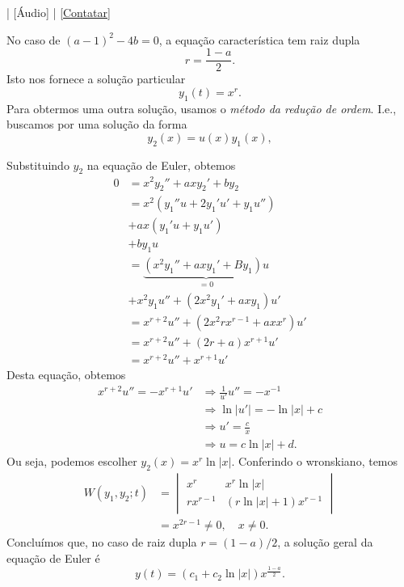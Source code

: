 \begin{flushright}
  [Vídeo] | [Áudio] | \href{https://phkonzen.github.io/notas/contato.html}{[Contatar]}
\end{flushright}

No caso de $(a-1)^2-4b = 0$, a equação característica tem raiz dupla
\begin{equation}
  r = \frac{1-a}{2}.
\end{equation}
Isto nos fornece a solução particular
\begin{equation}
  y_1(t) = x^r.
\end{equation}
Para obtermos uma outra solução, usamos o \emph{método da redução de ordem}. I.e., buscamos por uma solução da forma
\begin{equation}
  y_2(x) = u(x)y_1(x),
\end{equation}

Substituindo $y_2$ na equação de Euler, obtemos
\begin{align}
  0 &= x^2y_2'' + axy_2' + by_2 \\
  &= x^2\left(y_1''u + 2y_1'u' + y_1u''\right) \\
  &+ ax\left(y_1'u + y_1u'\right) \\
  &+ by_1u \\
  &= \underbrace{\left(x^2y_1'' + axy_1' + By_1\right)u}_{=0} \\
  &+ x^2y_1u'' + (2x^2y_1' + axy_1)u' \\
  &= x^{r+2}u'' + (2x^2rx^{r-1} + axx^r)u' \\
  &= x^{r+2}u'' + (2r+a)x^{r+1}u' \\
  &= x^{r+2}u'' + x^{r+1}u' 
\end{align}
Desta equação, obtemos
\begin{align}
  x^{r+2}u'' = -x^{r+1}u' &\Rightarrow \frac{1}{u'}u'' = -x^{-1} \\
  &\Rightarrow \ln|u'| = -\ln|x| + c \\
  &\Rightarrow u' = \frac{c}{x} \\
  &\Rightarrow u = c\ln|x| + d.
\end{align}
Ou seja, podemos escolher $y_2(x) = x^r\ln|x|$. Conferindo o wronskiano, temos
\begin{align}
  W(y_1,y_2;t) &=
  \begin{vmatrix}
    x^r & x^r\ln|x| \\
    rx^{r-1} & (r\ln|x| + 1)x^{r-1}
  \end{vmatrix} \\
  &= x^{2r-1} \neq 0,\quad x\neq 0.
\end{align}
Concluímos que, no caso de raiz dupla $r=(1-a)/2$, a solução geral da equação de Euler é
\begin{equation}
  y(t) = (c_1 + c_2\ln|x|)x^{\frac{1-a}{2}}.
\end{equation}

